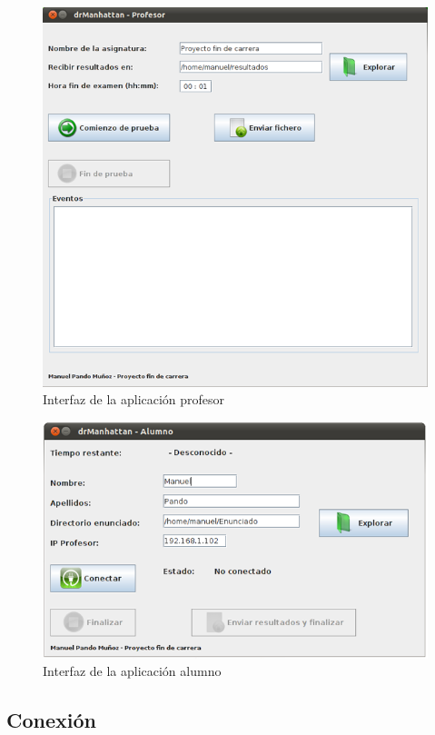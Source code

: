 \begin{figure}
    \centering
    \includegraphics[width=.90\linewidth]{iteracion1/GUIProfesor}
    \caption{Interfaz de la aplicación profesor}
    \label{fig:iteracion1:GUIProf}
\end{figure}


\begin{figure}
    \centering
    \includegraphics[width=.90\linewidth]{iteracion1/GUIAlumno}
    \caption{Interfaz de la aplicación alumno}
    \label{fig:iteracion1:GUIAlu}
\end{figure}



\subsection{Conexión}
\label{sec:iteracion1:conexion}

